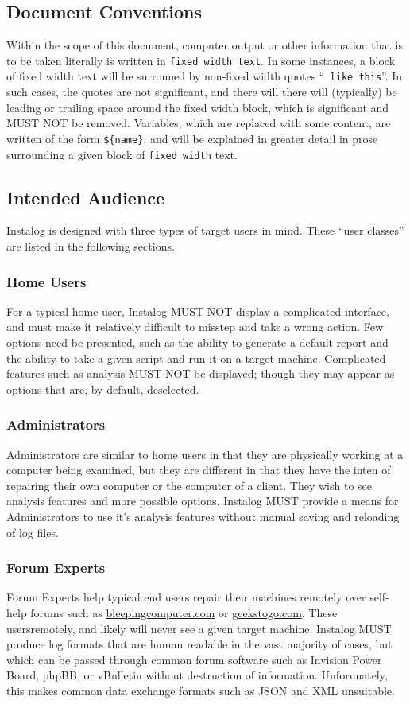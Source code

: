 \documentclass[letterpaper,12pt]{article}
\begin{document}
\subsection{Document Conventions}
Within the scope of this document, computer output or other information that is
to be taken literally is written in {\tt fixed width text}. In some instances, a
block of fixed width text will be surrouned by non-fixed width quotes ``{\tt\
like this}''. In such cases, the quotes are not significant, and there will
there will (typically) be leading or trailing space around the fixed width
block, which is significant and MUST NOT be removed. Variables, which are
replaced with some content, are written of the form {\tt \$\{name\}}, and will
be explained in greater detail in prose surrounding a given block of {\tt fixed
width} text.

\subsection{Intended Audience}
Instalog is designed with three types of target users in mind. These ``user
classes'' are listed in the following sections.

\subsubsection{Home Users}
For a typical home user, Instalog MUST NOT display a complicated interface, and
must make it relatively difficult to misstep and take a wrong action. Few
options need be presented, such as the ability to generate a default report and
the ability to take a given script and run it on a target machine. Complicated
features such as analysis MUST NOT be displayed; though they may appear as
options that are, by default, deselected.

\subsubsection{Administrators}
Administrators are similar to home users in that they are physically working at
a computer being examined, but they are different in that they have the inten of
repairing their own computer or the computer of a client. They wish to see
analysis features and more possible options. Instalog MUST provide a means for
Administrators to use it's analysis features without manual saving and reloading
of log files.

\subsubsection{Forum Experts}
Forum Experts help typical end users repair their machines remotely over
self-help forums such as \url{bleepingcomputer.com} or \url{geekstogo.com}.
These usersremotely, and likely will never see a given target machine.
Instalog MUST produce log formats that are human readable in the vast majority
of cases, but which can be passed through common forum software such as Invision
Power Board, phpBB, or vBulletin without destruction of information.
Unforunately, this makes common data exchange formats such as JSON and XML
unsuitable. 
\end{document}
